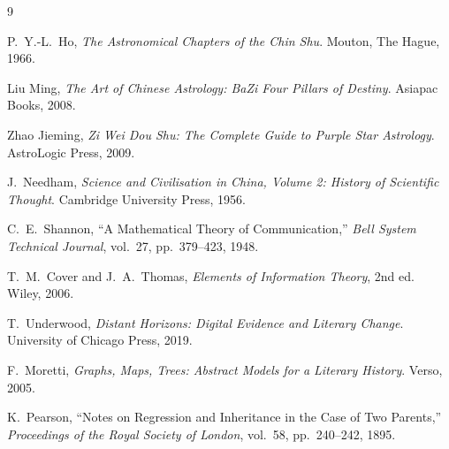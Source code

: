\documentclass[11pt]{article}
\begin{document}
\begin{thebibliography}{9}

P.~Y.-L.~Ho,
\emph{The Astronomical Chapters of the Chin Shu}.
Mouton, The Hague, 1966.

Liu Ming,
\emph{The Art of Chinese Astrology: BaZi Four Pillars of Destiny}.
Asiapac Books, 2008.

Zhao Jieming,
\emph{Zi Wei Dou Shu: The Complete Guide to Purple Star Astrology}.
AstroLogic Press, 2009.

J.~Needham,
\emph{Science and Civilisation in China, Volume 2: History of Scientific Thought}.
Cambridge University Press, 1956.

C.~E.~Shannon,
``A Mathematical Theory of Communication,''
\emph{Bell System Technical Journal}, vol.~27, pp.~379--423, 1948.

T.~M.~Cover and J.~A.~Thomas,
\emph{Elements of Information Theory}, 2nd ed.
Wiley, 2006.

T.~Underwood,
\emph{Distant Horizons: Digital Evidence and Literary Change}.
University of Chicago Press, 2019.

F.~Moretti,
\emph{Graphs, Maps, Trees: Abstract Models for a Literary History}.
Verso, 2005.

K.~Pearson,
``Notes on Regression and Inheritance in the Case of Two Parents,''
\emph{Proceedings of the Royal Society of London}, vol.~58, pp.~240--242, 1895.

\end{thebibliography}
\end{document}
